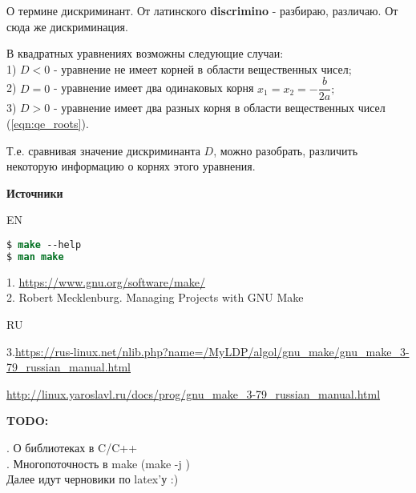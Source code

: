 О термине дискриминант. От латинского \textbf{discrimino} - разбираю, различаю. От сюда же дискриминация.

В квадратных уравнениях возможны следующие случаи:\\
1) $ D < 0 $ - уравнение не имеет корней в области вещественных чисел;  \\
2) $ D = 0 $ - уравнение имеет два одинаковых корня $ x_1=x_2=-\dfrac{b}{2a}; $ \\
3) $ D > 0 $ - уравнение имеет два разных корня в области вещественных чисел (\ref{eqn:qe_roots}).

Т.е. сравнивая значение дискриминанта $D$, можно разобрать, различить некоторую информацию о корнях этого уравнения.

\clearpage

\textbf{Источники}

EN

\begin{lstlisting}[language=csh]
$ make --help
$ man make
\end{lstlisting}

1. \href{https://www.gnu.org/software/make/}{https://www.gnu.org/software/make/}  \\
2. Robert Mecklenburg. Managing Projects with GNU Make

RU

3.\href{https://rus-linux.net/nlib.php?name=/MyLDP/algol/gnu_make/gnu_make_3-79_russian_manual.html}{https://rus-linux.net/nlib.php?name=/MyLDP/algol/gnu\_make/gnu\_make\_3-79\_russian\_manual.html}

\href{http://linux.yaroslavl.ru/docs/prog/gnu_make_3-79_russian_manual.html}{http://linux.yaroslavl.ru/docs/prog/gnu\_make\_3-79\_russian\_manual.html}

\clearpage

\textbf{TODO:}

. О библиотеках в C/C++ \\
. Многопоточность в make (make -j ) \\

Далее идут черновики по latex'у :)






